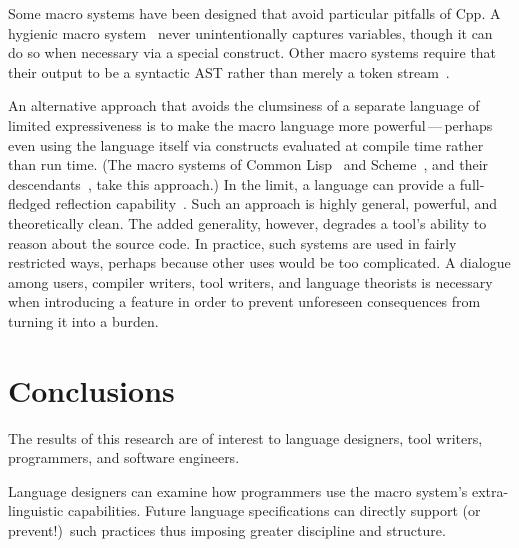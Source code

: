 \documentclass[10pt]{article}
\begin{document}
Some macro systems have been designed that avoid particular pitfalls of Cpp.
A hygienic macro system~\cite{lfp86*151} never unintentionally captures
variables, though it can do so when necessary via a special construct.
Other macro systems require that their output to be a syntactic AST rather
than merely a token stream~\cite{WeiseC93}.

An alternative approach that avoids the clumsiness of a separate language
of limited expressiveness is to make the macro language more
powerful\,---\,perhaps even using the language itself via constructs
evaluated at compile time rather than run time.  (The macro systems of
Common Lisp~\cite{commonlisp:languagespec} and
Scheme~\cite{Clinger91:R4RS}, and their descendants~\cite{WeiseC93}, take
this approach.)  In the limit, a language can provide a full-fledged
reflection capability~\cite{kicz91}.  Such an approach is highly general,
powerful, and theoretically clean.  The added generality, however, degrades
a tool's ability to reason about the source code.  In practice, such
systems are used in fairly restricted ways, perhaps because other uses
would be too complicated.  A dialogue among users, compiler writers, tool
writers, and language theorists is necessary when introducing a feature in
order to prevent unforeseen consequences from turning it into a burden.



\section{Conclusions}
\label{sec:conclusion}




The results of this research are of interest to language designers, tool
writers, programmers, and software engineers.

Language designers can examine how programmers use the macro system's
extra-linguistic capabilities.  Future language specifications can
directly support (or prevent!)\ such practices thus imposing greater
discipline and structure.
\end{document}
